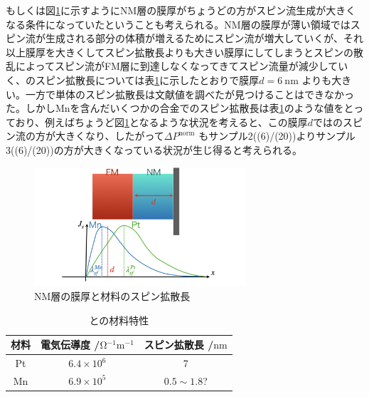 \documentclass[dvipdfmx,11pt]{jsreport}
\numberwithin{equation}{chapter}
\numberwithin{table}{chapter}
\begin{document}
もしくは図\ref{fig:adfig-adfig-002-jpeg}に示すようにNM層の膜厚がちょうどの方がスピン流生成が大きくなる条件になっていたということも考えられる。NM層の膜厚が薄い領域ではスピン流が生成される部分の体積が増えるためにスピン流が増大していくが、それ以上膜厚を大きくしてスピン拡散長よりも大きい膜厚にしてしまうとスピンの散乱によってスピン流がFM層に到達しなくなってきてスピン流量が減少していく、のスピン拡散長については表\ref{tab:mnpt}に示したとおりで膜厚$d=\SI{6}{\nano \metre}$ よりも大きい。一方で単体のスピン拡散長は文献値を調べたが見つけることはできなかった。しかしMnを含んだいくつかの合金でのスピン拡散長は表\ref{tab:mnpt}のような値をとっており、例えばちょうど図\ref{fig:adfig-adfig-002-jpeg}となるような状況を考えると、この膜厚$d$ではのスピン流の方が大きくなり、したがって$\Delta P^{\text{norm}}$ もサンプル2((6)/(20))よりサンプル3((6)/(20))の方が大きくなっている状況が生じ得ると考えられる。
\begin{figure}[H]
	\centering
	\includegraphics[width=0.7\textwidth]{adfig/adfig.002.jpeg}
	\caption{NM層の膜厚と材料のスピン拡散長}
	\label{fig:adfig-adfig-002-jpeg}
\end{figure}

\begin{table}[H]
	\centering
	\caption{との材料特性}
	\label{tab:mnpt}
	\begin{tabular}{c|c|c}\hline \hline
	 材料&電気伝導度 /$\si{\ohm^{-1}\metre ^{-1}}$ &スピン拡散長 /$\si{\nano \metre}$\\ \hline
	 Pt&$6.4\times 10^{6}$ \cite{PhysRevLett.101.036601}&7\cite{PhysRevLett.101.036601}\\ \hline
	 Mn&$6.9\times 10^{5}$&$0.5\sim 1.8$?\cite{PhysRevLett.113.196602} \\ \hline \hline
	\end{tabular}
\end{table}
\end{document}
